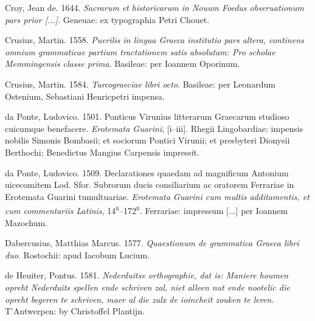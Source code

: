 \begin{styleStandard}
Croy, Jean de. 1644. \textit{Sacrarum et historicarum in Nouum Foedus obseruationum pars prior [...]}. Geneuae: ex typographia Petri Chouet.
\end{styleStandard}

\begin{styleStandard}
Crusius, Martin. 1558. \textit{Puerilis in lingua Graeca institutio pars altera, continens omnium grammaticae partium tractationem satis absolutam: Pro scholae Memmingensis classe prima}. Basileae: per Ioannem Oporinum.
\end{styleStandard}

\begin{styleStandard}
Crusius, Martin. 1584. \textit{Turcograeciae libri octo}. Basileae: per Leonardum Ostenium, Sebastiani Henricpetri impensa.
\end{styleStandard}

\begin{styleStandard}
da Ponte, Ludovico. 1501. Ponticus Virunius litterarum Graecarum studioso cuicumque benefacere. \textit{Erotemata Guarini}, [i–iii]. Rhegii Lingobardiae: impensis nobilis Simonis Bombasii; et sociorum Pontici Virunii; et presbyteri Dionysii Berthochi; Benedictus Mangius Carpensis impressit.
\end{styleStandard}

\begin{styleStandard}
da Ponte, Ludovico. 1509. Declarationes quaedam ad magnificum Antonium uicecomitem Lod. Sfor. Subrorum ducis consiliarium ac oratorem Ferrariae in Erotemata Guarini tumultuariae. \textit{Erotemata Guarini cum multis additamentis, et cum commentariis Latinis}, 14\textsc{\textsuperscript{r}}–172\textsc{\textsuperscript{r}}. Ferrariae: impressum [...] per Ioannem Mazochum.
\end{styleStandard}

\begin{styleStandard}
Dabercusius, Matthias Marcus. 1577. \textit{Quaestionum de grammatica Graeca libri duo}. Rostochii: apud Iacobum Lucium.
\end{styleStandard}

\begin{styleStandard}
de Heuiter, Pontus. 1581. \textit{Nederduitse orthographie, dat is: Maniere houmen opreht Nederduits spellen ende schriven zal, niet alleen nut ende nootelic die opreht begeren te schriven, maer al die zulx de ioincheit zouken te leren}. T’Antwerpen: by Christoffel Plantijn.
\end{styleStandard}

